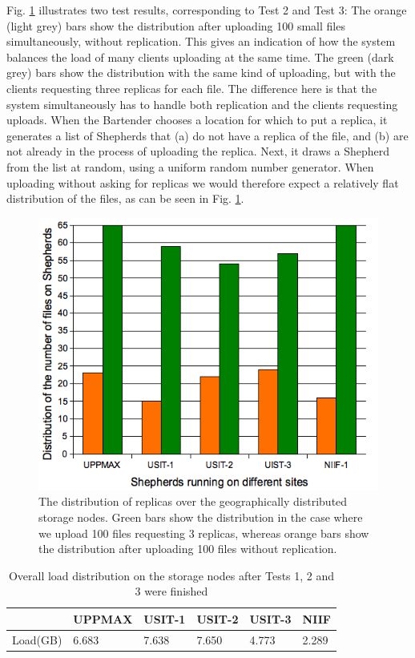 \documentclass[final]{ieee}
\begin{document}
Fig. \ref{fig:FileDistribution} illustrates two test results,
corresponding to Test 2 and Test 3: The orange (light grey) bars show the distribution after uploading 100 small files
simultaneously, without replication. This gives an indication of how
the system balances the load of many clients uploading at the same
time. The green (dark grey) bars show the distribution with the same kind of
uploading, but with the clients requesting three replicas for each file. The
difference here is that the system simultaneously has to handle both
replication and the clients requesting uploads. When the Bartender chooses
a location for which to put a replica, it generates a list of
Shepherds that (a) do not have a replica of the file, and (b) are not
already in the process of uploading the replica. Next, it draws a
Shepherd from the list at random, using a uniform random number
generator. When uploading without asking for replicas we would
therefore expect a relatively flat distribution of the files, as can
be seen in Fig. \ref{fig:FileDistribution}. 

\begin{figure}
\centering
\includegraphics[width=0.8\columnwidth]{FileDistribution}
\caption{The distribution of replicas over the geographically distributed
  storage nodes. Green bars show the distribution in the case where
  we upload 100 files requesting 3 replicas, whereas orange bars show
  the distribution after uploading 100 files without replication. }
\label{fig:FileDistribution}
\end{figure}

\begin{table}[ht]
\centering
\begin{tabular}[width = \columnwidth]{llllll}
\hline \hline
&\small{UPPMAX}&\small{USIT-1}&\small{USIT-2}&\small{USIT-3}&\small{NIIF}\\
\hline
           \small{Load(GB)}&6.683&7.638&7.650&4.773&2.289\\
\hline
\end{tabular}
\caption{Overall load distribution on the storage nodes after Tests 1,
2 and 3 were finished}
\label{table:load distribution}  
\end{table}
\end{document}
